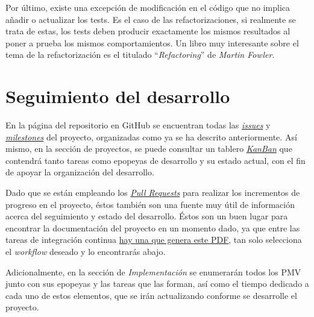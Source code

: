 Por último, existe una excepción de modificación en el código que no implica añadir o actualizar los tests. Es el caso de las refactorizaciones, si realmente se trata de estas, los tests deben producir exactamente los mismos resultados al poner a prueba los mismos comportamientos. Un libro muy interesante sobre el tema de la refactorización es el titulado ``\textit{Refactoring}'' de \textit{Martin Fowler}.

\section{Seguimiento del desarrollo}

En la página del repositorio en GitHub se encuentran todas las \href{https://github.com/Anglepi/My-Many-Reads/issues}{\textit{issues}} y \href{https://github.com/Anglepi/My-Many-Reads/milestones}{\textit{milestones}} del proyecto, organizadas como ya se ha descrito anteriormente. Así mismo, en la sección de proyectos, se puede consultar un tablero \href{https://github.com/users/Anglepi/projects/1}{\textit{KanBan}} que contendrá tanto tareas como epopeyas de desarrollo y su estado actual, con el fin de apoyar la organización del desarrollo.

Dado que se están empleando los \href{https://github.com/Anglepi/My-Many-Reads/pulls}{\textit{Pull Requests}} para realizar los incrementos de progreso en el proyecto, éstos también son una fuente muy útil de información acerca del seguimiento y estado del desarrollo. Éstos son un buen lugar para encontrar la documentación del proyecto en un momento dado, ya que entre las tareas de integración continua \href{https://github.com/Anglepi/My-Many-Reads/actions/workflows/latex-build.yml}{hay una que genera este PDF}, tan solo selecciona el \textit{workflow} deseado y lo encontrarás abajo.

Adicionalmente, en la sección de \textit{Implementación} se enumerarán todos los PMV junto con sus epopeyas y las tareas que las forman, así como el tiempo dedicado a cada uno de estos elementos, que se irán actualizando conforme se desarrolle el proyecto.